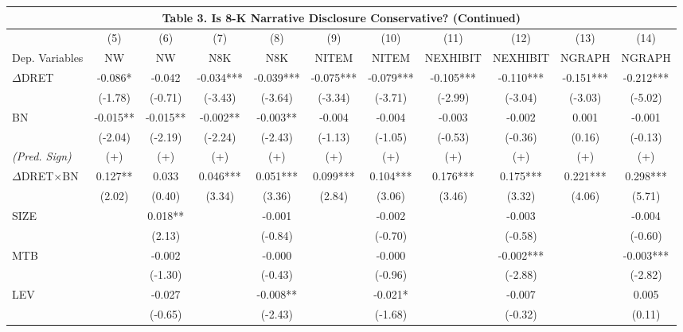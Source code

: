\begin{table}
	\begin{center}
		\tabcolsep=0.11cm
		\begin{tabular}{lcccccccccc}
			\multicolumn{11}{c}{\textbf{Table 3. Is 8-K Narrative Disclosure Conservative? (Continued)}} \\
			\toprule
			\toprule
			 & (5) & (6) & (7) & (8) & (9) & (10) & (11) & (12) & (13) & (14) \\
			Dep. Variables & NW & NW & N8K & N8K & NITEM & NITEM & NEXHIBIT & NEXHIBIT & NGRAPH & NGRAPH \\
			\midrule
			$\Delta$DRET & -0.086* & -0.042 & -0.034*** & -0.039*** & -0.075*** & -0.079*** & -0.105*** & -0.110*** & -0.151*** & -0.212*** \\
			 & (-1.78) & (-0.71) & (-3.43) & (-3.64) & (-3.34) & (-3.71) & (-2.99) & (-3.04) & (-3.03) & (-5.02) \\
			BN & -0.015** & -0.015** & -0.002** & -0.003** & -0.004 & -0.004 & -0.003 & -0.002 & 0.001 & -0.001 \\
			& (-2.04) & (-2.19) & (-2.24) & (-2.43) & (-1.13) & (-1.05) & (-0.53) & (-0.36) & (0.16) & (-0.13) \\
			\rowcolor[rgb]{ .906,  .902,  .902} \textit{(Pred. Sign)} & (+) & (+) & (+) & (+) & (+) & (+) & (+) & (+) & (+) & (+) \\
			\rowcolor[rgb]{ .906,  .902,  .902} $\Delta$DRET$\times$BN & 0.127** & 0.033 & 0.046*** & 0.051*** & 0.099*** & 0.104*** & 0.176*** & 0.175*** & 0.221*** & 0.298*** \\
			\rowcolor[rgb]{ .906,  .902,  .902}   & (2.02) & (0.40) & (3.34) & (3.36) & (2.84) & (3.06) & (3.46) & (3.32) & (4.06) & (5.71) \\
			SIZE &   & 0.018** &   & -0.001 &   & -0.002 &   & -0.003 &   & -0.004 \\
			&   & (2.13) &   & (-0.84) &   & (-0.70) &   & (-0.58) &   & (-0.60) \\
			MTB &   & -0.002 &   & -0.000 &   & -0.000 &   & -0.002*** &   & -0.003*** \\
			&    & (-1.30) &   & (-0.43) &   & (-0.96) &   & (-2.88) &   & (-2.82) \\
			LEV &  & -0.027 &   & -0.008** &   & -0.021* &   & -0.007 &   & 0.005 \\
			&   & (-0.65) &   & (-2.43) &   & (-1.68) &   & (-0.32) &   & (0.11) \\

\end{tabular}
\end{center}
\end{table}
